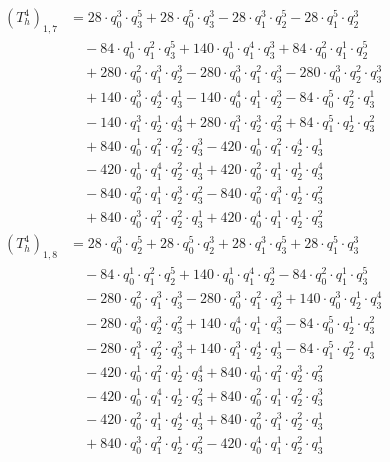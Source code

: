 \begin{align*}(T_{h}^4)_{1,7}&=28\cdot q_0^{3}\cdot q_3^{5}+28\cdot q_0^{5}\cdot q_3^{3}-28\cdot q_1^{3}\cdot q_2^{5}-28\cdot q_1^{5}\cdot q_2^{3}\\
&\quad -84\cdot q_0^{1}\cdot q_1^{2}\cdot q_3^{5}+140\cdot q_0^{1}\cdot q_1^{4}\cdot q_3^{3}+84\cdot q_0^{2}\cdot q_1^{1}\cdot q_2^{5}\\
&\quad +280\cdot q_0^{2}\cdot q_1^{3}\cdot q_2^{3}-280\cdot q_0^{3}\cdot q_1^{2}\cdot q_3^{3}-280\cdot q_0^{3}\cdot q_2^{2}\cdot q_3^{3}\\
&\quad +140\cdot q_0^{3}\cdot q_2^{4}\cdot q_3^{1}-140\cdot q_0^{4}\cdot q_1^{1}\cdot q_2^{3}-84\cdot q_0^{5}\cdot q_2^{2}\cdot q_3^{1}\\
&\quad -140\cdot q_1^{3}\cdot q_2^{1}\cdot q_3^{4}+280\cdot q_1^{3}\cdot q_2^{3}\cdot q_3^{2}+84\cdot q_1^{5}\cdot q_2^{1}\cdot q_3^{2}\\
&\quad +840\cdot q_0^{1}\cdot q_1^{2}\cdot q_2^{2}\cdot q_3^{3}-420\cdot q_0^{1}\cdot q_1^{2}\cdot q_2^{4}\cdot q_3^{1}\\
&\quad -420\cdot q_0^{1}\cdot q_1^{4}\cdot q_2^{2}\cdot q_3^{1}+420\cdot q_0^{2}\cdot q_1^{1}\cdot q_2^{1}\cdot q_3^{4}\\
&\quad -840\cdot q_0^{2}\cdot q_1^{1}\cdot q_2^{3}\cdot q_3^{2}-840\cdot q_0^{2}\cdot q_1^{3}\cdot q_2^{1}\cdot q_3^{2}\\
&\quad +840\cdot q_0^{3}\cdot q_1^{2}\cdot q_2^{2}\cdot q_3^{1}+420\cdot q_0^{4}\cdot q_1^{1}\cdot q_2^{1}\cdot q_3^{2}\end{align*}
\begin{align*}(T_{h}^4)_{1,8}&=28\cdot q_0^{3}\cdot q_2^{5}+28\cdot q_0^{5}\cdot q_2^{3}+28\cdot q_1^{3}\cdot q_3^{5}+28\cdot q_1^{5}\cdot q_3^{3}\\
&\quad -84\cdot q_0^{1}\cdot q_1^{2}\cdot q_2^{5}+140\cdot q_0^{1}\cdot q_1^{4}\cdot q_2^{3}-84\cdot q_0^{2}\cdot q_1^{1}\cdot q_3^{5}\\
&\quad -280\cdot q_0^{2}\cdot q_1^{3}\cdot q_3^{3}-280\cdot q_0^{3}\cdot q_1^{2}\cdot q_2^{3}+140\cdot q_0^{3}\cdot q_2^{1}\cdot q_3^{4}\\
&\quad -280\cdot q_0^{3}\cdot q_2^{3}\cdot q_3^{2}+140\cdot q_0^{4}\cdot q_1^{1}\cdot q_3^{3}-84\cdot q_0^{5}\cdot q_2^{1}\cdot q_3^{2}\\
&\quad -280\cdot q_1^{3}\cdot q_2^{2}\cdot q_3^{3}+140\cdot q_1^{3}\cdot q_2^{4}\cdot q_3^{1}-84\cdot q_1^{5}\cdot q_2^{2}\cdot q_3^{1}\\
&\quad -420\cdot q_0^{1}\cdot q_1^{2}\cdot q_2^{1}\cdot q_3^{4}+840\cdot q_0^{1}\cdot q_1^{2}\cdot q_2^{3}\cdot q_3^{2}\\
&\quad -420\cdot q_0^{1}\cdot q_1^{4}\cdot q_2^{1}\cdot q_3^{2}+840\cdot q_0^{2}\cdot q_1^{1}\cdot q_2^{2}\cdot q_3^{3}\\
&\quad -420\cdot q_0^{2}\cdot q_1^{1}\cdot q_2^{4}\cdot q_3^{1}+840\cdot q_0^{2}\cdot q_1^{3}\cdot q_2^{2}\cdot q_3^{1}\\
&\quad +840\cdot q_0^{3}\cdot q_1^{2}\cdot q_2^{1}\cdot q_3^{2}-420\cdot q_0^{4}\cdot q_1^{1}\cdot q_2^{2}\cdot q_3^{1}\end{align*}
